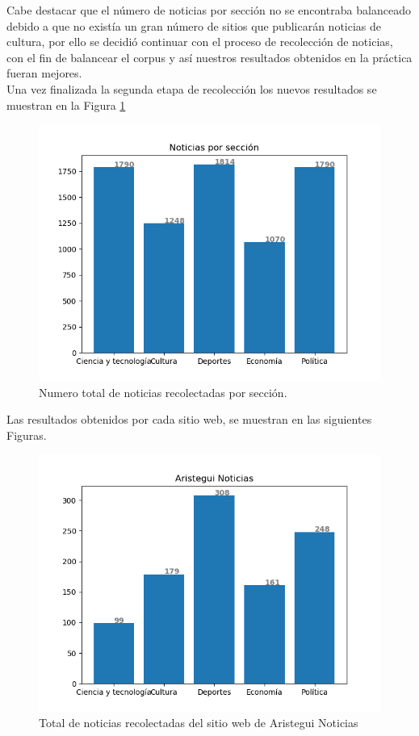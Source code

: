 Cabe destacar que el número de noticias por sección no se encontraba balanceado debido a que no existía un gran número de sitios que publicarán noticias de cultura, por ello se decidió continuar con el proceso de recolección de noticias, con el fin de balancear el corpus y así nuestros resultados obtenidos en la práctica fueran mejores.
\\
Una vez finalizada la segunda etapa de recolección los nuevos resultados se muestran en la Figura \ref{Fig:notseccion}

\begin{figure}[H]
	\centering
	\includegraphics[scale=.6]{imagenes/Capitulo5/noticiasPorSeccion.png}
	\caption{Numero total de noticias recolectadas por sección.}
	\label{Fig:notseccion}
\end{figure}

Las resultados obtenidos por cada sitio web, se muestran en las siguientes Figuras.
\\
\begin{figure}[H]
	\centering
	\includegraphics[scale=.45]{imagenes/Capitulo5/aristegui.png}
	\caption{Total de noticias recolectadas del sitio web de Aristegui Noticias}
	\label{Fig:notsitioaristegui}
\end{figure}

